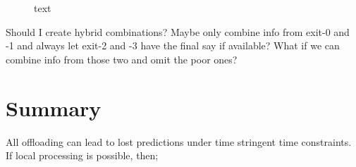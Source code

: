 \begin{figure}
	\centering
	\hfill
	\caption[short text]{text}
	\label{fig:info-combi}
\end{figure}

Should I create hybrid combinations? Maybe only combine info from exit-0 and -1 and always let exit-2 and -3 have the final say if available? What if we can combine info from those two and omit the poor ones? 

\section{Summary}

All offloading can lead to lost predictions under time stringent time constraints. If local processing is possible, then;

